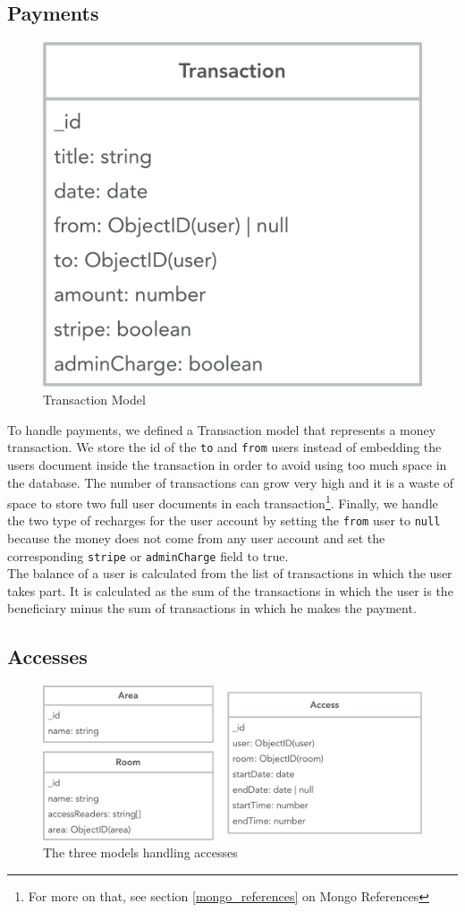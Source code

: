 \documentclass[11pt,a4paper]{report}
\begin{document}
\subsection{Payments}
\begin{figure}[H]
\begin{center}
	\includegraphics[width=.4\textwidth]{assets/transaction_model}
	\caption{Transaction Model}
\end{center}
\end{figure}
To handle payments, we defined a Transaction model that represents a money transaction. We store the id of the \verb+to+ and \verb+from+ users instead of embedding the users document inside the transaction in order to avoid using too much space in the database. The number of transactions can grow very high and it is a waste of space to store two full user documents in each transaction\footnote{For more on that, see section \ref{mongo_references} on Mongo References}. Finally, we handle the two type of recharges for the user account by setting the \verb+from+ user to \verb+null+ because the money does not come from any user account and set the corresponding \verb+stripe+ or \verb+adminCharge+ field to true. \\

The balance of a user is calculated from the list of transactions in which the user takes part. It is calculated as the sum of the transactions in which the user is the beneficiary minus the sum of transactions in which he makes the payment.
\subsection{Accesses}
\begin{figure}[H]
\begin{center}
	\includegraphics[width=.8\textwidth]{assets/access_model}
	\caption{The three models handling accesses}
\end{center}
\end{figure}
\end{document}
